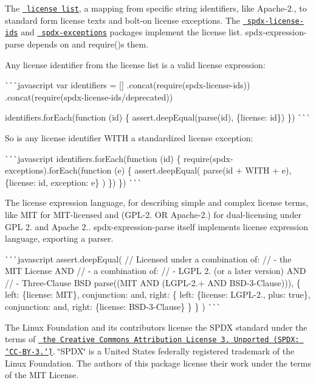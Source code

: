 \begin{DoxyEnumerate}
\item The \href{https://spdx.org/licenses}{\texttt{ license list}}, a mapping from specific string identifiers, like {\ttfamily Apache-\/2.}, to standard form license texts and bolt-\/on license exceptions. The \href{https://www.npmjs.com/package/spdx-license-ids}{\texttt{ spdx-\/license-\/ids}} and \href{https://www.npmjs.com/package/spdx-exceptions}{\texttt{ spdx-\/exceptions}} packages implement the license list. {\ttfamily spdx-\/expression-\/parse} depends on and {\ttfamily require()}s them.

Any license identifier from the license list is a valid license expression\+:

\`{}\`{}\`{}javascript var identifiers = \mbox{[}\mbox{]} .concat(require(\textquotesingle{}spdx-\/license-\/ids\textquotesingle{})) .concat(require(\textquotesingle{}spdx-\/license-\/ids/deprecated\textquotesingle{}))

identifiers.\+for\+Each(function (id) \{ assert.\+deep\+Equal(parse(id), \{license\+: id\}) \}) \`{}\`{}\`{}

So is any license identifier {\ttfamily WITH} a standardized license exception\+:

\`{}\`{}\`{}javascript identifiers.\+for\+Each(function (id) \{ require(\textquotesingle{}spdx-\/exceptions\textquotesingle{}).for\+Each(function (e) \{ assert.\+deep\+Equal( parse(id + \textquotesingle{} WITH \textquotesingle{} + e), \{license\+: id, exception\+: e\} ) \}) \}) \`{}\`{}\`{}
\item The license expression language, for describing simple and complex license terms, like {\ttfamily MIT} for MIT-\/licensed and {\ttfamily (GPL-\/2. OR Apache-\/2.)} for dual-\/licensing under GPL 2. and Apache 2.. {\ttfamily spdx-\/expression-\/parse} itself implements license expression language, exporting a parser.

\`{}\`{}\`{}javascript assert.\+deep\+Equal( // Licensed under a combination of\+: // -\/ the MIT License AND // -\/ a combination of\+: // -\/ LGPL 2. (or a later version) AND // -\/ Three-\/\+Clause BSD parse(\textquotesingle{}(MIT AND (LGPL-\/2.+ AND BSD-\/3-\/\+Clause))\textquotesingle{}), \{ left\+: \{license\+: \textquotesingle{}MIT\textquotesingle{}\}, conjunction\+: \textquotesingle{}and\textquotesingle{}, right\+: \{ left\+: \{license\+: \textquotesingle{}LGPL-\/2.\textquotesingle{}, plus\+: true\}, conjunction\+: \textquotesingle{}and\textquotesingle{}, right\+: \{license\+: \textquotesingle{}BSD-\/3-\/\+Clause\textquotesingle{}\} \} \} ) \`{}\`{}\`{}
\end{DoxyEnumerate}

The Linux Foundation and its contributors license the SPDX standard under the terms of \href{http://spdx.org/licenses/CC-BY-3.0}{\texttt{ the Creative Commons Attribution License 3. Unported (SPDX\+: \char`\"{}\+CC-\/\+BY-\/3.\char`\"{})}}. \char`\"{}\+SPDX\char`\"{} is a United States federally registered trademark of the Linux Foundation. The authors of this package license their work under the terms of the MIT License. 